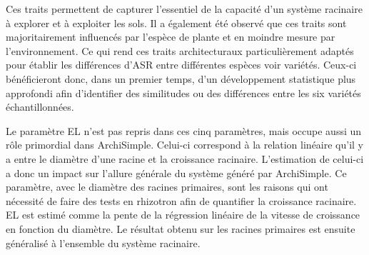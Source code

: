 Ces traits permettent de capturer l'essentiel de la capacité d'un système racinaire à explorer et à exploiter les sols.
Il a également été observé que ces traits sont majoritairement influencés par l'espèce de plante et en moindre mesure par l'environnement.
Ce qui rend ces traits architecturaux particulièrement adaptés pour établir les différences d'ASR entre différentes espèces voir variétés.
Ceux-ci bénéficieront donc, dans un premier temps, d'un développement statistique plus approfondi afin d'identifier des similitudes ou des différences entre les six variétés échantillonnées.
\newline

Le paramètre EL n'est pas repris dans ces cinq paramètres, mais occupe aussi un rôle primordial dans ArchiSimple.
Celui-ci correspond à la relation linéaire qu'il y a entre le diamètre d'une racine et la croissance racinaire.
L'estimation de celui-ci a donc un impact sur l'allure générale du système généré par ArchiSimple.
Ce paramètre, avec le diamètre des racines primaires, sont les raisons qui ont nécessité de faire des tests en rhizotron afin de quantifier la croissance racinaire.
EL est estimé comme la pente de la régression linéaire de la vitesse de croissance en fonction du diamètre.
Le résultat obtenu sur les racines primaires est ensuite généralisé à l'ensemble du système racinaire.